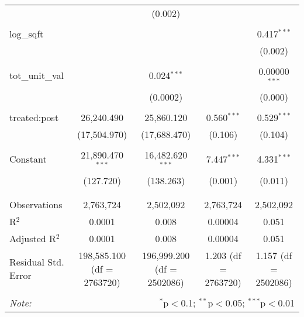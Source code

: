 \begin{table}[H]
{\begin{tabular}{@{\extracolsep{5pt}}lcccc}
   &  & (0.002) &  &  \\  

   & & & & \\  

  log\_sqft &  &  &  & 0.417$^{***}$ \\  

   &  &  &  & (0.002) \\  

   & & & & \\  

  tot\_unit\_val &  & 0.024$^{***}$ &  & 0.00000$^{***}$ \\  

   &  & (0.0002) &  & (0.000) \\  

   & & & & \\  

  treated:post & 26,240.490 & 25,860.120 & 0.560$^{***}$ & 0.529$^{***}$ \\  

   & (17,504.970) & (17,688.470) & (0.106) & (0.104) \\  

   & & & & \\  

  Constant & 21,890.470$^{***}$ & 16,482.620$^{***}$ & 7.447$^{***}$ & 4.331$^{***}$ \\  

   & (127.720) & (138.263) & (0.001) & (0.011) \\  

   & & & & \\  

 \hline \\[-1.8ex]  

 Observations & 2,763,724 & 2,502,092 & 2,763,724 & 2,502,092 \\  

 R$^{2}$ & 0.0001 & 0.008 & 0.00004 & 0.051 \\  

 Adjusted R$^{2}$ & 0.0001 & 0.008 & 0.00004 & 0.051 \\  

 Residual Std. Error & 198,585.100 (df = 2763720) & 196,999.200 (df = 2502086) & 1.203 (df = 2763720) & 1.157 (df = 2502086) \\  

 \hline  

 \hline \\[-1.8ex]  

 \textit{Note:}  & \multicolumn{4}{r}{$^{*}$p$<$0.1; $^{**}$p$<$0.05; $^{***}$p$<$0.01} \\  

 \end{tabular}}  

 \end{table}  

